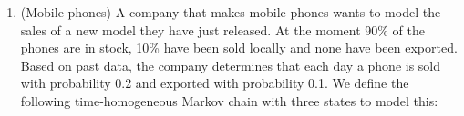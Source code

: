 \documentclass[12pt,twoside]{article}
\begin{document}
\begin{enumerate}
\item (Mobile phones)
A company that makes mobile phones wants to model the sales of a new model they have just released. At the moment 90\% of the phones are in stock, 10\% have been sold locally and none have been exported. Based on past data, the company determines that each day a phone is sold with probability 0.2 and exported with probability 0.1. We define the following time-homogeneous Markov chain with three states to model this:

\begin{center}
\end{center} 


\end{enumerate}
\end{document}
